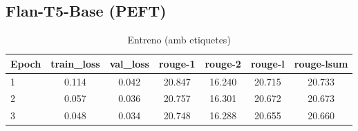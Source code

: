 \subsection{Flan-T5-Base (PEFT)}
\begin{table}[H]
    \centering
    \caption{Entreno (amb etiquetes)}
    \label{tab:additional-training}
    \begin{tabular}{lcccccc}
    \toprule
    Epoch & train\_loss & val\_loss & rouge-1 & rouge-2 & rouge-l & rouge-lsum \\
    \midrule
    1 & 0.114 & 0.042 & 20.847 & 16.240 & 20.715 & 20.733 \\
    2 & 0.057 & 0.036 & 20.757 & 16.301 & 20.672 & 20.673 \\
    3 & 0.048 & 0.034 & 20.748 & 16.288 & 20.655 & 20.660 \\
    \bottomrule
    \end{tabular}
\end{table}
